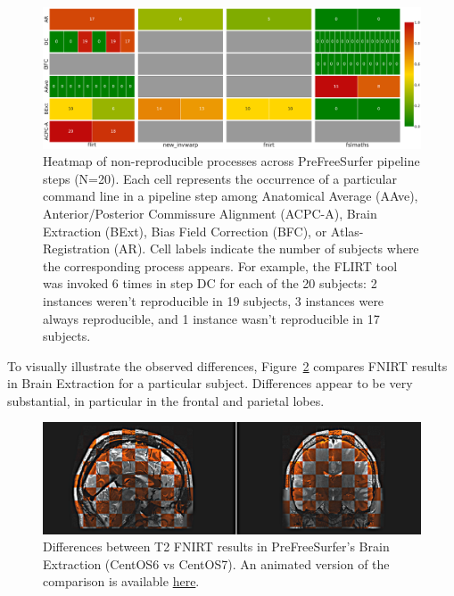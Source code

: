 \documentclass[a4paper,num-refs]{oup-contemporary}
\begin{document}
\begin{figure}
\centering
  \includegraphics[width=\textwidth]{./data/pfs-20sbj-output/heatmap.pdf}
  \caption{Heatmap of non-reproducible processes across PreFreeSurfer pipeline steps (N=20). 
  Each cell represents the occurrence of a particular command line in a
  pipeline step among Anatomical Average (AAve), Anterior/Posterior
  Commissure Alignment (ACPC-A), Brain Extraction (BExt), Bias Field
  Correction (BFC), or Atlas-Registration (AR). Cell labels indicate the
  number of subjects where the corresponding process appears. For example,
  the FLIRT tool was invoked 6 times in step DC for each of the 20
  subjects: 2 instances weren't reproducible in 19 subjects, 3
  instances were always reproducible, and 1 instance wasn't reproducible in
  17 subjects.
        }
  \label{fig:pfs_freq}
\end{figure}


To visually illustrate the observed differences,
Figure~\ref{fig:fnirt_result} compares FNIRT results in Brain Extraction
for a particular subject. Differences appear to be very substantial, in
particular in the frontal and parietal lobes. 
\begin{figure}
  \centering
    \includegraphics[width=\columnwidth]{images/t2w_alignment.png} 
    \caption{Differences between T2 FNIRT results in PreFreeSurfer's Brain Extraction (CentOS6 vs 
    CentOS7). An animated version of the comparison is available 
    \href{https://github.com/big-data-lab-team/HCP-reproducibility-paper/blob/master/images/pfs_t2w_alignment.gif}
    {here}.
} 
    \label{fig:fnirt_result}
\end{figure}
\end{document}
